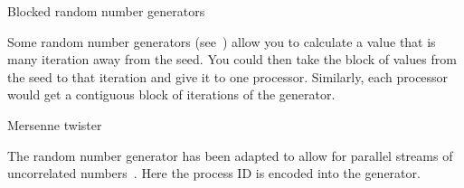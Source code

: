  {Blocked random number generators}

Some random number generators (see~\cite{LEcuyer:multiple-random})
allow you to calculate a value that is many iteration away from the seed.
You could then take the block of values from the seed to that iteration
and give it to one processor. Similarly, each processor would get a contiguous
block of iterations of the generator.

 {Mersenne twister}

The  random number generator has been
adapted to allow for parallel streams of uncorrelated
numbers~\cite{Matsumoto:DynamicMersenne}. Here the process ID is
encoded into the generator.


